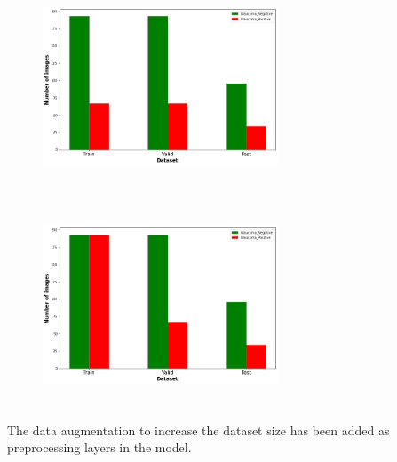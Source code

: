 \documentclass[11pt, a4paper]{article}
\begin{document}
\begin{figure}[H]
\centering
\begin{minipage}{.5\textwidth}
  \centering
  \includegraphics[width=7cm, height=6cm]{imgs/general/Data distribution before data balancing.png}
  \label{fig:Data distribution before data balancing}
\end{minipage}%
\begin{minipage}{.5\textwidth}
  \centering
  \includegraphics[width=7cm, height=6cm]{imgs/general/Data distribution after data balancing.png} 
  \label{fig:Data distribution after data balancing}
\end{minipage}
\end{figure}
\noindent The data augmentation to increase the dataset size has been added as preprocessing layers in the model.
\end{document}
